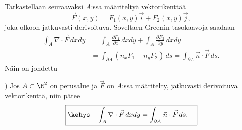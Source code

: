 Tarkastellaan seuraavaksi $A$:ssa määriteltyä vektorikenttää
\[
\vec F(x,y)=F_1(x,y)\vec i+F_2(x,y)\vec j,
\]
joka olkoon jatkuvasti derivoituva. Soveltaen Greenin tasokaavoja saadaan
\begin{align*}
\int_A \nabla\cdot\vec F\,dxdy &= \int_A \frac{\partial F_1}{\partial x}\,dxdy
                                 +\int_A \frac{\partial F_2}{\partial y}\,dxdy \\
                               &= \int_{\partial A} (n_xF_1+n_yF_2)\,ds
                                = \int_{\partial A} \vec n\cdot\vec F\, ds. 
\end{align*}
Näin on johdettu
\begin{Lause} ) \label{Gaussin lause tasossa}
 Jos $A \subset \R^2$ on perusalue ja
$\vec F$ on $A$:ssa määritelty, jatkuvasti derivoituva vektorikenttä, niin pätee
\[
\boxed{\kehys\quad \int_A \nabla\cdot\vec F\,dxdy=\int_{\partial A}\vec n\cdot\vec F\,ds. \quad }
\]
\end{Lause}

